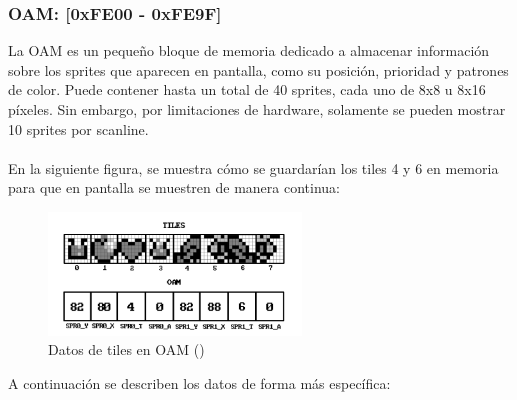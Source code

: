 \subsubsection{OAM: [0xFE00 - 0xFE9F]}\label{mem:oam}
La OAM es un pequeño bloque de memoria dedicado a almacenar información sobre los sprites que aparecen en pantalla, como su posición, prioridad y patrones de color. Puede contener hasta un total de 40 sprites, cada uno de 8x8 u 8x16 píxeles. Sin embargo, por limitaciones de hardware, solamente se pueden mostrar 10 sprites por scanline.
\\\\
En la siguiente figura, se muestra cómo se guardarían los tiles 4 y 6 en memoria para que en pantalla se muestren de manera continua:

\begin{figure}[H]
    \centering
    \includegraphics[width=0.6\textwidth]{include/images/oam_tiles.png}
    \caption{Datos de tiles en OAM (\cite{goldensacra})}
    \label{figure:oam_tiles}
\end{figure}

A continuación se describen los datos de forma más específica:

